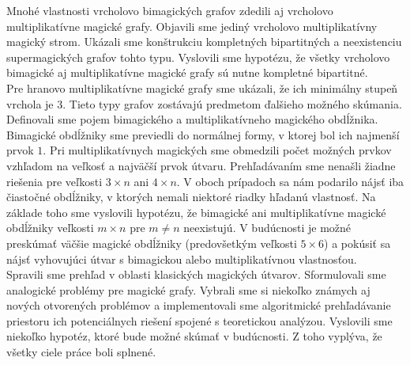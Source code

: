 Mnohé vlastnosti vrcholovo bimagických grafov zdedili aj vrcholovo multiplikatívne magické grafy. Objavili sme jediný vrcholovo multiplikatívny magický strom. Ukázali sme konštrukciu kompletných bipartitných a neexistenciu supermagických grafov tohto typu. Vyslovili sme hypotézu, že všetky vrcholovo bimagické aj multiplikatívne magické grafy sú nutne kompletné bipartitné. \\

Pre hranovo multiplikatívne magické grafy sme ukázali, že ich minimálny stupeň vrchola je $3$. Tieto typy grafov zostávajú predmetom ďalšieho možného skúmania. \\

Definovali sme pojem bimagického a multiplikatívneho magického obdĺžnika. Bimagické obdĺžniky sme previedli do normálnej formy, v ktorej bol ich najmenší prvok $1$. Pri multiplikatívnych magických sme obmedzili počet možných prvkov vzhľadom na veľkosť a najväčší prvok útvaru. Prehľadávaním sme nenašli žiadne riešenia pre veľkosti $3 \times n$ ani $4 \times n$. V oboch prípadoch sa nám podarilo nájsť iba čiastočné obdĺžniky, v ktorých nemali niektoré riadky hľadanú vlastnosť. Na základe toho sme vyslovili hypotézu, že bimagické ani multiplikatívne magické obdĺžniky veľkosti $m \times n$ pre $m \neq n$ neexistujú. V budúcnosti je možné preskúmať väčšie magické obdĺžniky (predovšetkým veľkosti $5 \times 6$) a pokúsiť sa nájsť vyhovujúci útvar s bimagickou alebo multiplikatívnou vlastnosťou. \\

Spravili sme prehľad v oblasti klasických magických útvarov. Sformulovali sme analogické problémy pre magické grafy. Vybrali sme si niekoľko známych aj nových otvorených problémov a implementovali sme algoritmické prehľadávanie priestoru ich potenciálnych riešení spojené s teoretickou analýzou. Vyslovili sme niekoľko hypotéz, ktoré bude možné skúmať v budúcnosti. Z toho vyplýva, že všetky ciele práce boli splnené.
